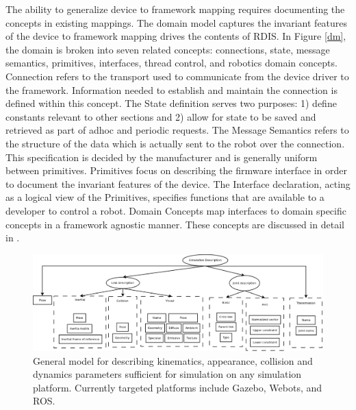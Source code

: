 The ability to generalize device to framework mapping requires documenting the concepts in existing mappings.  The domain model captures the invariant features of the device to framework mapping drives the contents of RDIS.  In Figure \ref{dm}, the domain is broken into seven related concepts: connections, state, message semantics, primitives, interfaces, thread control, and robotics domain concepts.  {\sc Connection} refers to the transport used to communicate from the device driver to the framework.  Information needed to establish and maintain the connection is defined within this concept. The {\sc State} definition serves two purposes: 1) define constants relevant to other sections and 2) allow for state to be saved and retrieved as part of adhoc and periodic requests.   The {\sc Message Semantics} refers to the structure of the data which is actually sent to the robot over the connection. This specification is decided by the manufacturer and is generally uniform between primitives.   {\sc Primitives} focus on describing the firmware interface in order to document the invariant features of the device.   The {\sc Interface} declaration, acting as a logical view of the {\sc Primitives},  specifies functions that are available to a developer to control a robot.   {\sc Domain Concepts} map interfaces to domain specific concepts in a framework agnostic manner.  These concepts are discussed in detail in \cite{Anderson2012}.

\begin{figure}[thpb]
      \centering
      \includegraphics[width=6in]{images/kvc.pdf}
      \caption{General model for describing kinematics, appearance, collision and dynamics parameters sufficient for simulation on any simulation platform.  Currently targeted platforms include Gazebo, Webots, and ROS.}
      \label{kvc}
\end{figure}


